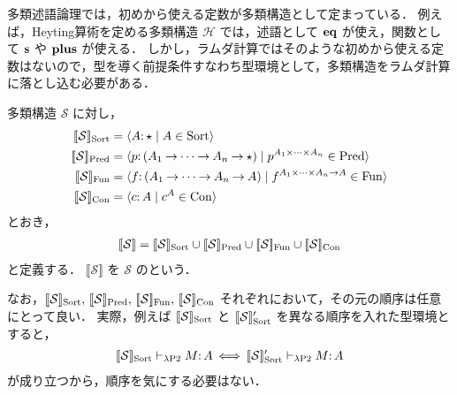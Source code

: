 \documentclass[./main]{subfiles}
\begin{document}

多類述語論理では，初めから使える定数が多類構造として定まっている．
例えば，Heyting算術を定める多類構造 $ \mathscr{H} $ では，述語として $ \mathbf{eq} $ が使え，関数として $ \mathbf{s} $ や $ \mathbf{plus} $ が使える．
しかし，ラムダ計算ではそのような初めから使える定数はないので，型を導く前提条件すなわち型環境として，多類構造をラムダ計算に落とし込む必要がある．

\begin{ziphildefi}
多類構造 $ \mathscr{S} $ に対し，
\begin{align*}
\llbracket \mathscr{S} \rrbracket _{\op{Sort}} & = \langle A \ocl\, \typstar \mid A \in \op{Sort} \rangle \\
\llbracket \mathscr{S} \rrbracket _{\op{Pred}} & = \langle p \ocl\, (A _1 \bto \cdots \bto A _n \bto \typstar) \mid p ^{A _1 \times \cdots \times A _n} \in \op{Pred} \rangle \\
\llbracket \mathscr{S} \rrbracket _{\op{Fun}} & = \langle f \ocl\, (A _1 \bto \cdots \bto A _n \bto A) \mid f ^{A _1 \times \cdots \times A _n \bto A} \in \op{Fun} \rangle \\
\llbracket \mathscr{S} \rrbracket _{\op{Con}} & = \langle c \ocl\, A \mid c ^A \in \op{Con} \rangle
\end{align*}
とおき，
\begin{gather*}
\llbracket \mathscr{S} \rrbracket = \llbracket \mathscr{S} \rrbracket _{\op{Sort}} \cup \llbracket \mathscr{S} \rrbracket _{\op{Pred}} \cup \llbracket \mathscr{S} \rrbracket _{\op{Fun}} \cup \llbracket \mathscr{S} \rrbracket _{\op{Con}}
\end{gather*}
と定義する．
$ \llbracket \mathscr{S} \rrbracket $ を $ \mathscr{S} $ のという．
\end{ziphildefi}

なお，$ \llbracket \mathscr{S} \rrbracket _{\op{Sort}},\ats \llbracket \mathscr{S} \rrbracket _{\op{Pred}},\ats \llbracket \mathscr{S} \rrbracket _{\op{Fun}},\ats \llbracket \mathscr{S} \rrbracket _{\op{Con}} $ それぞれにおいて，その元の順序は任意にとって良い．
実際，例えば $ [\![ \mathcal{S} ]\!] _{\mathop{\mathrm{Sort}}\nolimits} $ と $ [\![ \mathcal{S} ]\!]' _{\mathop{\mathrm{Sort}}\nolimits} $ を異なる順序を入れた型環境とすると，
\begin{gather*}
[\![ \mathcal{S} ]\!] _{\mathop{\mathrm{Sort}}\nolimits} \vdash _{\lambda \mathrm{P2}} M \mathord{:}\, A \,\Longleftrightarrow\, [\![ \mathcal{S} ]\!]' _{\mathop{\mathrm{Sort}}\nolimits} \vdash _{\lambda \mathrm{P2}} M \mathord{:}\, A
\end{gather*}
が成り立つから，順序を気にする必要はない．
\end{document}
